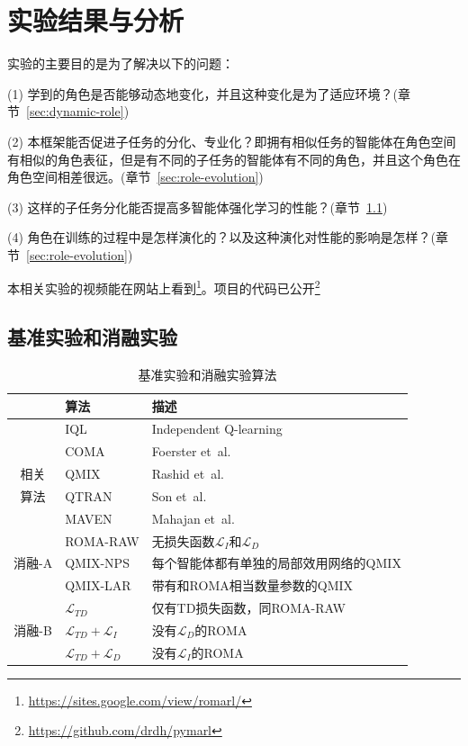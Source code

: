 
\chapter{实验结果与分析}
实验的主要目的是为了解决以下的问题：

(1) 学到的角色是否能够动态地变化，并且这种变化是为了适应环境？(章节~\ref{sec:dynamic-role})

(2) 本框架能否促进子任务的分化、专业化？即拥有相似任务的智能体在角色空间有相似的角色表征，但是有不同的子任务的智能体有不同的角色，并且这个角色在角色空间相差很远。(章节~\ref{sec:role-evolution})

(3) 这样的子任务分化能否提高多智能体强化学习的性能？(章节~\ref{sec:baseline-ablation})

(4) 角色在训练的过程中是怎样演化的？以及这种演化对性能的影响是怎样？(章节~\ref{sec:role-evolution})

本相关实验的视频能在网站上看到\footnote{\url{https://sites.google.com/view/romarl/}}。项目的代码已公开\footnote{\url{https://github.com/drdh/pymarl}}

\section{基准实验和消融实验}\label{sec:baseline-ablation}

\begin{table}[htb]
    \centering\small
    \caption{基准实验和消融实验算法}
    \label{tab:baselines}
    \begin{tabular}{cll}
      \toprule
        & 算法   & 描述                         \\
      \midrule
        　　& IQL   & Independent Q-learning \\
        　　& COMA  & Foerster et~al.~\cite{foerster2018counterfactual} \\
      相关  & QMIX  & Rashid et~al.~\cite{rashid2018qmix} \\
      算法  & QTRAN & Son et~al.~\cite{son2019qtran} \\
        　　& MAVEN & Mahajan et~al.~\cite{mahajan2019maven} \\
      \midrule 
             & ROMA-RAW & 无损失函数$\mathcal{L}_I$和$\mathcal{L}_D$ \\
      消融-A    & QMIX-NPS & 每个智能体都有单独的局部效用网络的QMIX \\
        　　  & QMIX-LAR & 带有和ROMA相当数量参数的QMIX \\
       \midrule
            & $\mathcal{L}_{TD}$ & 仅有TD损失函数，同ROMA-RAW \\
      消融-B & $\mathcal{L}_{TD}+\mathcal{L}_I$ & 没有$\mathcal{L}_D$的ROMA \\
            & $\mathcal{L}_{TD}+\mathcal{L}_D$ & 没有$\mathcal{L}_I$的ROMA \\
      \bottomrule
    \end{tabular}
  \end{table}

